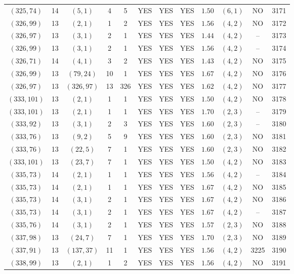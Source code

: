 \begin{longtable}{|c|c|c|c|c|c|c|c|c|c|c|c|}
$(325,74)$ & 14 & $(5,1)$ & 4 & 5 & YES & YES & YES & $1.50$ & $(6,1)$ & NO & 3171\\
$(326,99)$ & 13 & $(2,1)$ & 1 & 2 & YES & YES & YES & $1.56$ & $(4,2)$ & NO & 3172\\
$(326,97)$ & 13 & $(3,1)$ & 2 & 1 & YES & YES & YES & $1.44$ & $(4,2)$ & -- & 3173\\
$(326,99)$ & 13 & $(3,1)$ & 2 & 1 & YES & YES & YES & $1.56$ & $(4,2)$ & -- & 3174\\
$(326,71)$ & 14 & $(4,1)$ & 3 & 2 & YES & YES & YES & $1.43$ & $(4,2)$ & NO & 3175\\
$(326,99)$ & 13 & $(79,24)$ & 10 & 1 & YES & YES & YES & $1.67$ & $(4,2)$ & NO & 3176\\
$(326,97)$ & 13 & $(326,97)$ & 13 & 326 & YES & YES & YES & $1.62$ & $(4,2)$ & NO & 3177\\
$(333,101)$ & 13 & $(2,1)$ & 1 & 1 & YES & YES & YES & $1.50$ & $(4,2)$ & NO & 3178\\
$(333,101)$ & 13 & $(2,1)$ & 1 & 1 & YES & YES & YES & $1.70$ & $(2,3)$ & -- & 3179\\
$(333,92)$ & 13 & $(3,1)$ & 2 & 3 & YES & YES & YES & $1.60$ & $(2,3)$ & -- & 3180\\
$(333,76)$ & 13 & $(9,2)$ & 5 & 9 & YES & YES & YES & $1.60$ & $(2,3)$ & NO & 3181\\
$(333,76)$ & 13 & $(22,5)$ & 7 & 1 & YES & YES & YES & $1.60$ & $(2,3)$ & NO & 3182\\
$(333,101)$ & 13 & $(23,7)$ & 7 & 1 & YES & YES & YES & $1.50$ & $(4,2)$ & NO & 3183\\
$(335,73)$ & 14 & $(2,1)$ & 1 & 1 & YES & YES & YES & $1.56$ & $(4,2)$ & -- & 3184\\
$(335,73)$ & 14 & $(2,1)$ & 1 & 1 & YES & YES & YES & $1.67$ & $(4,2)$ & NO & 3185\\
$(335,73)$ & 14 & $(3,1)$ & 2 & 1 & YES & YES & YES & $1.67$ & $(4,2)$ & NO & 3186\\
$(335,73)$ & 14 & $(3,1)$ & 2 & 1 & YES & YES & YES & $1.67$ & $(4,2)$ & -- & 3187\\
$(335,76)$ & 14 & $(3,1)$ & 2 & 1 & YES & YES & YES & $1.57$ & $(2,3)$ & NO & 3188\\
$(337,98)$ & 13 & $(24,7)$ & 7 & 1 & YES & YES & YES & $1.70$ & $(2,3)$ & NO & 3189\\
$(337,91)$ & 13 & $(137,37)$ & 11 & 1 & YES & YES & YES & $1.56$ & $(4,2)$ & 3225 & 3190\\
$(338,99)$ & 13 & $(2,1)$ & 1 & 2 & YES & YES & YES & $1.56$ & $(4,2)$ & NO & 3191\\

\end{longtable}
